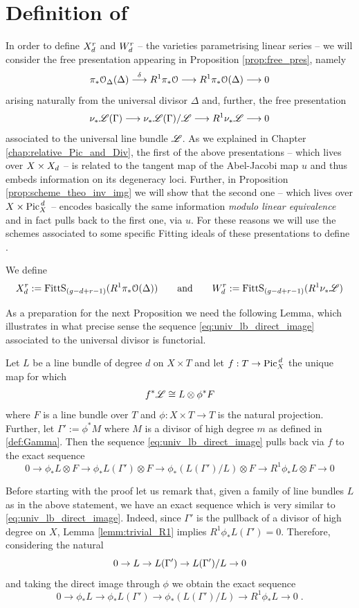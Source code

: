 \section{Definition of \modu}\label{sec:defi_modu}
	In order to define $X_d^r$ and $W_d^r$ -- the varieties parametrising linear series -- we will consider the free presentation appearing in Proposition \ref{prop:free_pres}, namely
	$$ 
	\pi_* \mathcal{O}_{\Delta}(\Delta)\overset{\delta}{\longrightarrow} R^1 \pi_* \mathcal{O} \longrightarrow R^1 \pi_* \mathcal{O}(\Delta) \longrightarrow 0 
	$$
	arising naturally from the universal divisor $\Delta$ and, further, the free presentation
	$$ 
	\nu_{*} \mathscr{L}(\Gamma)\longrightarrow \nu_{*} \mathscr{L}(\Gamma) / \mathscr{L} \longrightarrow R^1 \nu_{*} \mathscr{L} \longrightarrow 0
	$$
	associated to the universal line bundle $\mathscr{L}$.
	As we explained in Chapter \ref{chap:relative_Pic_and_Div}, the first of the above presentations -- which lives over $X\times X_d$ -- is related to the tangent map of the Abel-Jacobi map $u$ and thus embeds information on its degeneracy loci. 
	Further, in Proposition \ref{prop:scheme_theo_inv_img} we will show that the second one -- which lives over $X\times \operatorname{Pic}^{\,d}_X$ -- encodes basically the same information \emph{modulo linear equivalence} and in fact pulls back to the first one, via $u$. 
	For these reasons we will use the schemes associated to some specific Fitting ideals of these presentations to define \modu.
	\begin{defi}
		We define
		$$ X_d^r := \operatorname{FittS}_{(g-d+r-1)}(R^1\pi_* \mathcal{O}(\Delta)) \qquad \text{and} \qquad  W_d^r := \operatorname{FittS}_{(g-d+r-1)}(R^1\nu_{*} \mathscr{L}) $$
	\end{defi}
	As a preparation for the next Proposition we need the following Lemma, which illustrates in what precise sense the sequence \eqref{eq:univ_lb_direct_image} associated to the universal divisor is functorial.
	\begin{lemm}\label{lemm:functoriality}
		Let $L$ be a line bundle of degree $d$ on $X\times T$ and let $f:T\to \operatorname{Pic}^{\,d}_X$ the unique map for which
		$$ f^*\mathscr{L} \cong L \otimes \phi^* F $$
		where $F$ is a line bundle over $T$ and $\phi: X\times T \to T$ is the natural projection. Further, let $\Gamma':= \phi^* M$ where $M$ is a divisor of high degree $m$ as defined in \ref{def:Gamma}.
		Then the sequence \eqref{eq:univ_lb_direct_image} pulls back via $f$ to the exact sequence
		$$ 0 \to \phi_*L\otimes F  \to \phi_* L(\Gamma')\otimes F \to \phi_* (L(\Gamma') / L)\otimes F  \to R^1 \phi_* L\otimes F  \to 0 $$ 
	\end{lemm}
	\begin{rema}
		Before starting with the proof let us remark that, given a family of line bundles $L$ as in the above statement, we have an exact sequence which is very similar to \eqref{eq:univ_lb_direct_image}. Indeed, since $\Gamma'$ is the pullback of a divisor of high degree on $X$, Lemma \ref{lemm:trivial_R1} implies $R^1\phi_* L(\Gamma') = 0$. Therefore, considering the natural \ses 
		$$ 0 \to L \to L(\Gamma') \to L(\Gamma')/L \to 0 $$
		and taking the direct image through $\phi$ we obtain the exact sequence
		$$ 0 \to \phi_*L  \to \phi_* L(\Gamma') \to \phi_* (L(\Gamma') / L)  \to R^1 \phi_* L  \to 0\;. $$
	\end{rema}
